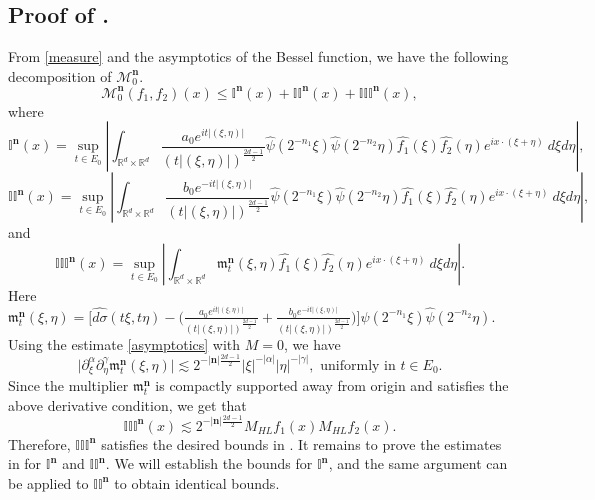 \documentclass[a4paper,reqno]{amsart}
\numberwithin{equation}{section}
\newcommand{\R}{{\mathbb {R}}}
\begin{document}
	\subsection{Proof of .}\label{Mn0} From \eqref{measure} and the asymptotics of the Bessel function, we have the following decomposition of $\mathcal{M}^{\mathbf{n}}_0$.
	\begin{equation}\label{localdecomposition}
		\mathcal{M}^{\mathbf{n}}_0(f_1,f_2)(x)\leq \mathbb{I}^{\mathbf{n}}(x)+\mathbb{II}^{\mathbf{n}}(x)+\mathbb{III}^{\mathbf{n}}(x),
	\end{equation}
	where
	\[\mathbb{I}^{\mathbf{n}}(x)=\sup_{t\in E_0}\left|\int_{\R^d\times\R^d}\frac{a_0 e^{it|(\xi,\eta)|}}{(t|(\xi,\eta)|)^{\frac{2d-1}{2}}}\widehat{\psi}\left(2^{-n_1} \xi\right)\widehat{\psi}\left(2^{-n_2} \eta\right)\widehat{f_1}(\xi)\widehat{f_2}(\eta)e^{ix\cdot(\xi+\eta)}~d\xi d\eta\right|,\]
	\[\mathbb{II}^{\mathbf{n}}(x)=\sup_{t\in E_0}\left|\int_{\R^d\times\R^d}\frac{b_0 e^{-it|(\xi,\eta)|}}{(t|(\xi,\eta)|)^{\frac{2d-1}{2}}}\widehat{\psi}\left(2^{-n_1} \xi\right)\widehat{\psi}\left(2^{-n_2} \eta\right)\widehat{f_1}(\xi)\widehat{f_2}(\eta)e^{ix\cdot(\xi+\eta)}~d\xi d\eta\right|,\]
	and
	\[\mathbb{III}^{\mathbf{n}}(x)=\sup_{t\in E_0}\left|\int_{\R^d\times\R^d}\mathfrak{m}_{t}^{\mathbf{n}}(\xi,\eta)\widehat{f_1}(\xi)\widehat{f_2}(\eta)e^{ix\cdot(\xi+\eta)}~d\xi d\eta\right|.\]
	Here $\mathfrak{m}_{t}^{\mathbf{n}}(\xi,\eta)=\Big[\widehat{d\sigma}(t\xi,t\eta)-\Big(\frac{a_0 e^{it|(\xi,\eta)|}}{(t|(\xi,\eta)|)^{\frac{2d-1}{2}}}+\frac{b_0 e^{-it|(\xi,\eta)|}}{(t|(\xi,\eta)|)^{\frac{2d-1}{2}}}\Big)\Big]\widehat{\psi}\left(2^{-n_1} \xi\right)\widehat{\psi}\left(2^{-n_2} \eta\right)$. Using the estimate \eqref{asymptotics} with $M=0$, we have
	\[\big|\partial^{\alpha}_{\xi}\partial^{\gamma}_{\eta}\mathfrak{m}_{t}^{\mathbf{n}}(\xi,\eta)\big|\lesssim2^{-|\mathbf{n}|\frac{2d-1}{2}}|\xi|^{-|\alpha|}|\eta|^{-|\gamma|}, \text{ uniformly in }t\in E_0.\]
	Since the multiplier $\mathfrak{m}_{t}^{\mathbf{n}}$ is compactly supported away from origin and satisfies the above derivative condition, we get that
	\begin{equation}\label{error}
		\mathbb{III}^{\mathbf{n}}(x)\lesssim 2^{-|\mathbf{n}|\frac{2d-1}{2}}M_{HL}f_1(x)M_{HL}f_2(x).
	\end{equation}
	Therefore, $\mathbb{III}^{\mathbf{n}}$ satisfies the desired bounds in . It remains to prove the estimates in  for $\mathbb{I}^{\mathbf{n}}$ and $\mathbb{II}^{\mathbf{n}}$. We will establish the bounds for $\mathbb{I}^{\mathbf{n}}$, and the same argument can be applied to $\mathbb{II}^{\mathbf{n}}$ to obtain identical bounds.
	
\end{document}
